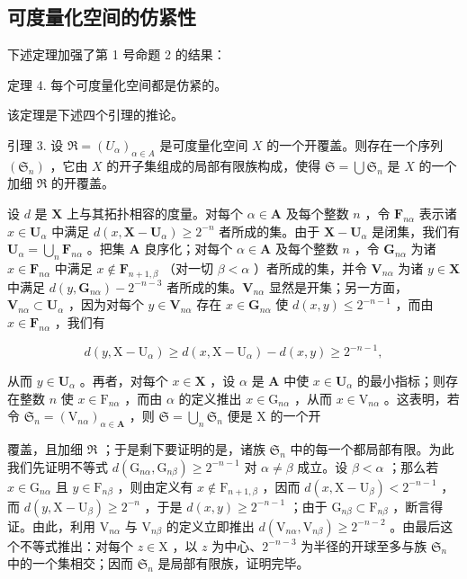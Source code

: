 \subsection{可度量化空间的仿紧性}

下述定理加强了第 1 号命题 2 的结果：

定理 4. 每个可度量化空间都是仿紧的。

该定理是下述四个引理的推论。

引理 3. 设 \(\Re = (U_{\alpha})_{\alpha \in A}\) 是可度量化空间 \(X\) 的一个开覆盖。则存在一个序列 \((\mathfrak{S}_n)\) ，它由 \(X\) 的开子集组成的局部有限族构成，使得 \(\mathfrak{S} = \bigcup \mathfrak{S}_n\) 是 \(X\) 的一个加细 \(\Re\) 的开覆盖。

设 \(d\) 是 \(\mathbf{X}\) 上与其拓扑相容的度量。对每个 \(\alpha \in \mathbf{A}\) 及每个整数 \(n\) ，令 \(\mathbf{F}_{n\alpha}\) 表示诸 \(x \in \mathbf{U}_{\alpha}\) 中满足 \(d(x, \mathbf{X} - \mathbf{U}_{\alpha}) \geqslant 2^{-n}\) 者所成的集。由于 \(\mathbf{X} - \mathbf{U}_{\alpha}\) 是闭集，我们有 \(\mathbf{U}_{\alpha} = \bigcup_{n} \mathbf{F}_{n\alpha}\) 。把集 \(\mathbf{A}\) 良序化；对每个 \(\alpha \in \mathbf{A}\) 及每个整数 \(n\) ，令 \(\mathbf{G}_{n\alpha}\) 为诸 \(x \in \mathbf{F}_{n\alpha}\) 中满足 \(x \notin \mathbf{F}_{n+1,\beta}\) （对一切 \(\beta < \alpha\) ）者所成的集，并令 \(\mathbf{V}_{n\alpha}\) 为诸 \(y \in \mathbf{X}\) 中满足 \(d(y, \mathbf{G}_{n\alpha}) - 2^{-n-3}\) 者所成的集。\(\mathbf{V}_{n\alpha}\) 显然是开集；另一方面，\(\mathbf{V}_{n\alpha} \subset \mathbf{U}_{\alpha}\) ，因为对每个 \(y \in \mathbf{V}_{n\alpha}\) 存在 \(x \in \mathbf{G}_{n\alpha}\) 使 \(d(x, y) \leqslant 2^{-n-1}\) ，而由 \(x \in \mathbf{F}_{n\alpha}\) ，我们有

\[
d (y, \mathrm{X} - \mathrm{U} _ {\alpha}) \geqslant d (x, \mathrm{X} - \mathrm{U} _ {\alpha}) - d (x, y) \geqslant 2 ^ {- n - 1},
\]

从而 \(y \in \mathbf{U}_{\alpha}\) 。再者，对每个 \(x \in \mathbf{X}\) ，设 \(\alpha\) 是 \(\mathbf{A}\) 中使 \(x \in \mathbf{U}_{\alpha}\) 的最小指标；则存在整数 \(n\) 使 \(x \in \mathrm{F}_{n\alpha}\) ，而由 \(\alpha\) 的定义推出 \(x \in \mathrm{G}_{n\alpha}\) ，从而 \(x \in \mathrm{V}_{n\alpha}\) 。这表明，若令 \(\mathfrak{S}_n = (\mathrm{V}_{n\alpha})_{\alpha \in \mathbf{A}}\) ，则 \(\mathfrak{S} = \bigcup_{n} \mathfrak{S}_n\) 便是 X 的一个开

覆盖，且加细 \(\Re\) ；于是剩下要证明的是，诸族 \(\mathfrak{S}_n\) 中的每一个都局部有限。为此我们先证明不等式 \(d(\mathrm{G}_{n\alpha}, \mathrm{G}_{n\beta}) \geqslant 2^{-n-1}\) 对 \(\alpha \neq \beta\) 成立。设 \(\beta < \alpha\) ；那么若 \(x \in \mathrm{G}_{n\alpha}\) 且 \(y \in \mathrm{F}_{n\beta}\) ，则由定义有 \(x \notin \mathrm{F}_{n+1, \beta}\) ，因而 \(d(x, \mathrm{X} - \mathrm{U}_{\beta}) < 2^{-n-1}\) ，而 \(d(y, \mathrm{X} - \mathrm{U}_{\beta}) \geqslant 2^{-n}\) ，于是 \(d(x, y) \geqslant 2^{-n-1}\) ；由于 \(\mathrm{G}_{n\beta} \subset \mathrm{F}_{n\beta}\) ，断言得证。由此，利用 \(\mathrm{V}_{n\alpha}\) 与 \(\mathrm{V}_{n\beta}\) 的定义立即推出 \(d(\mathrm{V}_{n\alpha}, \mathrm{V}_{n\beta}) \geqslant 2^{-n-2}\) 。由最后这个不等式推出：对每个 \(z \in \mathrm{X}\) ，以 \(z\) 为中心、\(2^{-n-3}\) 为半径的开球至多与族 \(\mathfrak{S}_n\) 中的一个集相交；因而 \(\mathfrak{S}_n\) 是局部有限族，证明完毕。

